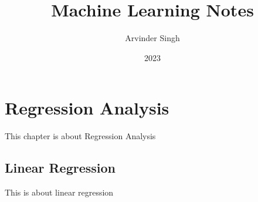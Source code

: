 \documentclass[]{report}
\begin{document}
\title{Machine Learning Notes}
\author{Arvinder Singh}
\date{2023}
\maketitle

\chapter{Regression Analysis}
This chapter is about Regression Analysis 

\section{Linear Regression}
This is about linear regression
\end{document}
